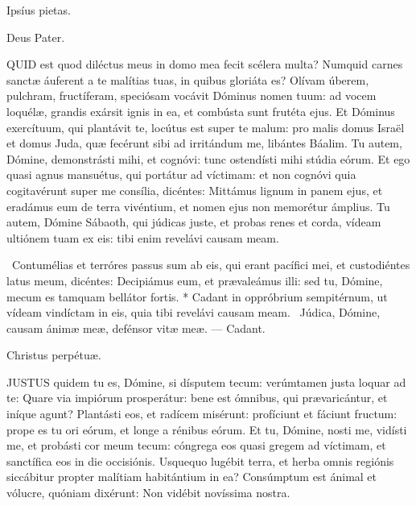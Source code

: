 \sectionornament



 Ipsíus pietas.

 Deus Pater.



\lettrine[lines=2]{Q}{UID} est quod diléctus meus in domo mea fecit scélera multa? Numquid carnes sanctæ áuferent a te malítias tuas, in quibus gloriáta es? Olívam úberem, pulchram, fructíferam, speciósam vocávit Dóminus nomen tuum: ad vocem loquélæ, grandis exársit ignis in ea, et combústa sunt frutéta ejus. Et Dóminus exercítuum, qui plantávit te, locútus est super te malum: pro malis domus Israël et domus Juda, quæ fecérunt sibi ad irritándum me, libántes Báalim. Tu autem, Dómine, demonstrásti mihi, et cognóvi: tunc ostendísti mihi stúdia eórum. Et ego quasi agnus mansuétus, qui portátur ad víctimam: et non cognóvi quia cogitavérunt super me consília, dicéntes: Mittámus lignum in panem ejus, et eradámus eum de terra vivéntium, et nomen ejus non memorétur ámplius. Tu autem, Dómine Sábaoth, qui júdicas juste, et probas renes et corda, vídeam ultiónem tuam ex eis: tibi enim revelávi causam meam.

\R\ Contumélias et terróres passus sum ab eis, qui erant pacífici mei, et custodiéntes latus meum, dicéntes: Decipiámus eum, et prævaleámus illi: sed tu, Dómine, mecum es tamquam bellátor fortis. * Cadant in oppróbrium sempitérnum, ut vídeam vindíctam in eis, quia tibi revelávi causam meam. \V\ Júdica, Dómine, causam ánimæ meæ, defénsor vitæ meæ. --- Cadant.

 Christus perpétuæ.


\lettrine[lines=2]{J}{USTUS} quidem tu es, Dómine, si dísputem tecum: verúmtamen justa loquar ad te: Quare via impiórum prosperátur: bene est ómnibus, qui prævaricántur, et iníque agunt? Plantásti eos, et radícem misérunt: profíciunt et fáciunt fructum: prope es tu ori eórum, et longe a rénibus eórum. Et tu, Dómine, nosti me, vidísti me, et probásti cor meum tecum: cóngrega eos quasi gregem ad víctimam, et sanctífica eos in die occisiónis. Usquequo lugébit terra, et herba omnis regiónis siccábitur propter malítiam habitántium in ea? Consúmptum est ánimal et vólucre, quóniam dixérunt: Non vidébit novíssima nostra.

